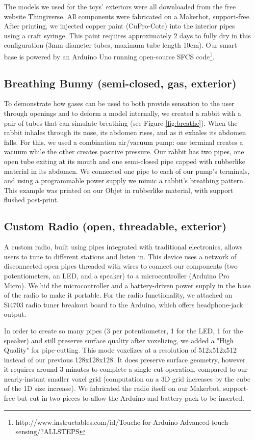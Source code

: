 The models we used for the toys' exteriors were all downloaded from the free website Thingiverse.  All components were fabricated on a Makerbot, support-free.  After printing, we injected copper paint (CuPro-Cote) into the interior pipes using a craft syringe.  This paint requires approximately 2 days to fully dry in this configuration (3mm diameter tubes, maximum tube length 10cm).  Our smart base is powered by an Arduino Uno running open-source SFCS code\footnote{http://www.instructables.com/id/Touche-for-Arduino-Advanced-touch-sensing/?ALLSTEPS}.

\subsection{Breathing Bunny (semi-closed, gas, exterior)}

To demonstrate how gases can be used to both provide sensation to the user through openings and to deform a model internally, we created a rabbit with a pair of tubes that can simulate breathing (see Figure \ref{fig:breathe}).  When the rabbit inhales through its nose, its abdomen rises, and as it exhales its abdomen falls.  For this, we used a combination air/vacuum pump: one terminal creates a vacuum while the other creates positive pressure.  Our rabbit has two pipes, one open tube exiting at its mouth and one semi-closed pipe capped with rubberlike material in its abdomen.  We connected one pipe to each of our pump's terminals, and using a programmable power supply we mimic a rabbit's breathing pattern.  This example was printed on our Objet in rubberlike material, with support flushed post-print.

\subsection{Custom Radio (open, threadable, exterior)}

A custom radio, built using pipes integrated with traditional electronics, allows users to tune to different stations and listen in.  This device uses a network of disconnected open pipes threaded with wires to connect our components (two potentiometers, an LED, and a speaker) to a microcontroller (Arduino Pro Micro). We hid the microcontroller and a battery-driven power supply in the base of the radio to make it portable.  For the radio functionality, we attached an Si4703 radio tuner breakout board to the Arduino, which offers headphone-jack output.

In order to create so many pipes (3 per potentiometer, 1 for the LED, 1 for the speaker) and still preserve surface quality after voxelizing, we added a "High Quality" for pipe-cutting.  This mode voxelizes at a resolution of 512x512x512 instead of our previous 128x128x128.  It does preserve surface geometry, however it requires around 3 minutes to complete a single cut operation, compared to our nearly-instant smaller voxel grid (computation on a 3D grid increases by the cube of the 1D size increase).  We fabricated the radio itself on our Makerbot, support-free but cut in two pieces to allow the Arduino and battery pack to be inserted.

